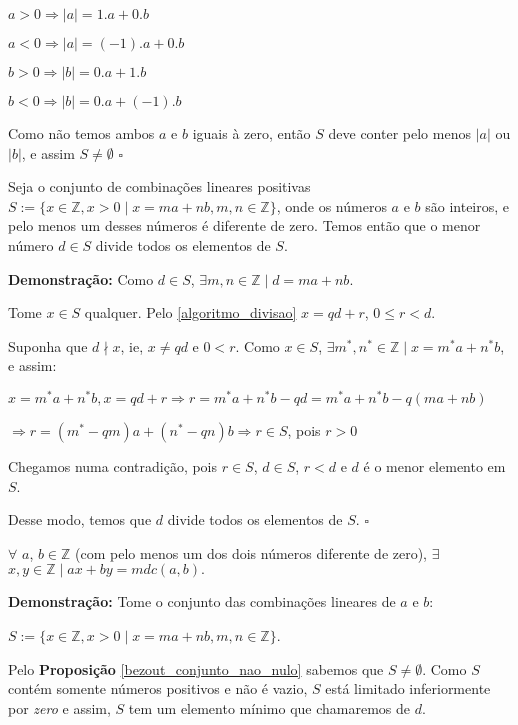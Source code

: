 $a > 0 \Rightarrow |a| = 1.a + 0.b$

$a < 0 \Rightarrow |a| = (-1).a + 0.b$

$b > 0 \Rightarrow |b| = 0.a + 1.b$

$b < 0 \Rightarrow |b| = 0.a + (-1).b$

Como não temos ambos $a$ e $b$ iguais à zero, então $S$ deve conter pelo menos $|a|$ ou $|b|$, e assim $S \neq \emptyset$ $\square$


\begin{corollary}\label{bezout_conjunto_divide}
Seja o conjunto de combinações lineares positivas $S := \{x\in\mathbb{Z}, x>0 \mid x = ma + nb, m,n\in \mathbb{Z}\}$, onde os números $a$ e $b$ são inteiros, 
e pelo menos um desses números é diferente de zero. Temos então que o menor número $d \in S$ divide todos os elementos de $S$.
\end{corollary}
\textbf{Demonstração:}
Como $d \in S$, $\exists m,n\in\mathbb{Z} \mid d = ma + nb$.

Tome $x \in S$ qualquer. Pelo \autoref{algoritmo_divisao} $x = qd + r$, $0 \leq r < d$.

Suponha que $d\nmid x$, ie, $x \neq qd$ e $0 < r$. Como $x \in S$, $\exists m^*,n^*\in\mathbb{Z} \mid x = m^*a + n^*b$, e assim:

$x = m^*a + n^*b, x = qd + r \Rightarrow r = m^*a + n^*b - qd = m^*a + n^*b - q(ma + nb)$ 

$\Rightarrow r = (m^* - qm)a + (n^* - qn)b \Rightarrow r \in S$, pois $r > 0$

Chegamos numa contradição, pois $r \in S$, $d \in S$, $r < d$ e $d$ é o menor elemento em $S$.

Desse modo, temos que $d$ divide todos os elementos de $S$. $\square$


\begin{theorem}\label{teorema_bezout}
$\forall$ $a$, $b \in \mathbb{Z}$ (com pelo menos um dos dois números diferente de zero), $\exists$ $x, y \in \mathbb{Z} \mid ax + by = mdc(a, b).$
\end{theorem}
\textbf{Demonstração:}
Tome o conjunto das combinações lineares de $a$ e $b$:

$S := \{x\in\mathbb{Z}, x>0 \mid x = ma + nb, m,n\in \mathbb{Z}\}$.

Pelo \textbf{Proposição} \autoref{bezout_conjunto_nao_nulo} sabemos que $S \neq \emptyset$. Como $S$ contém somente números positivos e não é vazio, 
$S$ está limitado inferiormente por \textit{zero} e assim, $S$ tem um elemento mínimo que chamaremos de $d$.

